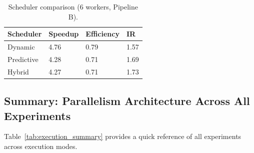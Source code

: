 \documentclass[acmsmall]{acmart}
\begin{document}
\begin{table}[htbp]
  \centering
  \caption{Scheduler comparison (6 workers, Pipeline B).}
  \label{tab:sched_summary}
  \small
  \begin{tabularx}{\linewidth}{lXXX}
    \toprule
    \textbf{Scheduler} & \textbf{Speedup} & \textbf{Efficiency} & \textbf{IR} \\
    \midrule
    Dynamic    & 4.76 & 0.79 & 1.57 \\
    Predictive & 4.28 & 0.71 & 1.69 \\
    Hybrid     & 4.27 & 0.71 & 1.73 \\
    \bottomrule
  \end{tabularx}
\end{table}


\subsection{Summary: Parallelism Architecture Across All Experiments}

Table~\ref{tab:execution_summary} provides a quick reference of all experiments across execution modes.
\end{document}
